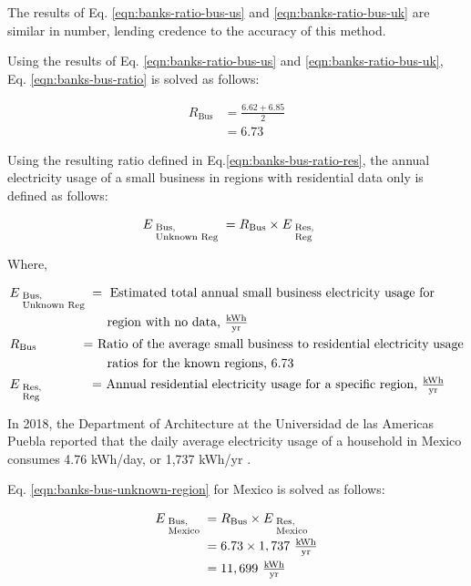 The results of Eq. \eqref{eqn:banks-ratio-bus-us} and \eqref{eqn:banks-ratio-bus-uk} are similar in number, lending credence to the accuracy of this method.

Using the results of Eq. \eqref{eqn:banks-ratio-bus-us} and \eqref{eqn:banks-ratio-bus-uk}, Eq. \eqref{eqn:banks-bus-ratio} is solved as follows:

\begin{align}\label{eqn:banks-bus-ratio-res}
  R_\textrm{Bus} &= \frac{ 6.62 + 6.85 } { 2 } \\
                 &= 6.73 \nonumber
\end{align}

Using the resulting ratio defined in Eq.\eqref{eqn:banks-bus-ratio-res}, the annual electricity usage of a small business in regions with residential data only is defined as follows:

\begin{align}\label{eqn:banks-bus-unknown-region}
&E_{\begin{subarray}{l} \textrm{ {Bus,} } \\ \textrm{ {Unknown Reg} } \end{subarray} } = R_\textrm{Bus} \times E_{\begin{subarray}{l} \textrm{ {Res,} } \\ \textrm{ {Reg} } \end{subarray} }
\end{align}

Where,

\begin{align*}
&E_{\begin{subarray}{l} \textrm{ {Bus,} } \\ \textrm{ {Unknown Reg} } \end{subarray} } = \textrm{ Estimated total annual small business electricity usage for } \\
&\textrm{\ \qquad \qquad \quad \quad \ \ \ \ region with no data, $\tfrac{ \textrm{kWh} } { \textrm{yr} }$} \\
&R_\textrm{Bus} \textrm{ \ \ \qquad \ \ = Ratio of the average small business to residential electricity usage} \\
&\textrm{\ \qquad \qquad \quad \quad \ \ \ \ ratios for the known regions, 6.73} \\
&E_ { \begin{subarray}{l} \textrm{ {Res,} } \\ \textrm{ {Reg} } \end{subarray} } \textrm{ \quad \qquad \ = Annual residential electricity usage for a specific region, $\tfrac{ \textrm{kWh} } { \textrm{yr} }$}
\end{align*}

In 2018, the Department of Architecture at the Universidad de las Americas Puebla reported that the daily average electricity usage of a household in Mexico consumes 4.76 kWh/day, or 1,737 kWh/yr \cite{residential-mexico}.

Eq. \eqref{eqn:banks-bus-unknown-region} for Mexico is solved as follows:

\begin{align}\label{eqn:banks-bus-mexico}
  E_{\begin{subarray}{l} \textrm{ {Bus,} } \\ \textrm{ {Mexico} } \end{subarray} } &= R_\textrm{Bus} \times E_{\begin{subarray}{l} \textrm{ {Res,} } \\ \textrm{ {Mexico} } \end{subarray} } \\
                             &= 6.73 \times 1,737 \ \tfrac{ \textrm{kWh} } { \textrm{yr} } \nonumber \\
                             &= 11,699 \ \tfrac{ \textrm{kWh} } { \textrm{yr} } \nonumber
\end{align}

